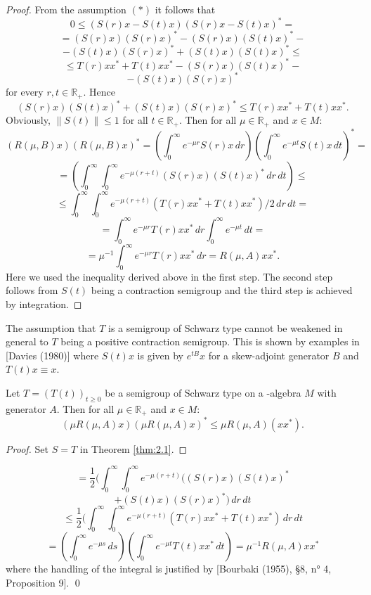 \begin{proof}
From the assumption $ (*) $ it follows that
\[
0 \leq (S(r)x - S(t)x)(S(r)x - S(t)x)^* =
\]
\[
= (S(r)x)(S(r)x)^* - (S(r)x)(S(t)x)^* -
\]
\[
- (S(t)x)(S(r)x)^* + (S(t)x)(S(t)x)^* \leq
\]
\[
\leq T(r)xx^* + T(t)xx^* - (S(r)x)(S(t)x)^* -
\]
\[
- (S(t)x)(S(r)x)^*
\]
for every $ r,t \in \mathbb{R}_+ $.
Hence
\[
(S(r)x)(S(t)x)^* + (S(t)x)(S(r)x)^* \leq T(r)xx^* + T(t)xx^*.
\]
Obviously, $ \|S(t)\| \leq 1 $ for all $ t \in \mathbb{R}_+ $.
Then for all $ \mu \in \mathbb{R}_+ $ and $ x \in M $:
\[
(R(\mu,B)x)(R(\mu,B)x)^* = (\int_0^\infty e^{-\mu r}S(r)x \, dr)(\int_0^\infty e^{-\mu t}S(t)x \, dt)^* =
\]
\[
= (\int_0^\infty \int_0^\infty e^{-\mu(r+t)} (S(r)x)(S(t)x)^* \, dr \, dt) \leq
\]
\[
\leq \int_0^\infty \int_0^\infty e^{-\mu(r+t)} (T(r)xx^* + T(t)xx^*)/2 \, dr \, dt =
\]
\[
= \int_0^\infty e^{-\mu r} T(r)xx^* \, dr \int_0^\infty e^{-\mu t} \, dt =
\]
\[
= \mu^{-1} \int_0^\infty e^{-\mu r} T(r)xx^* \, dr = R(\mu,A)xx^*.
\]
Here we used the inequality derived above in the first step.
The second step follows from $ S(t)$ being a contraction semigroup and the third step is achieved by integration.
\end{proof}

\begin{remark}
The assumption that $ T $ is a semigroup of Schwarz type cannot be weakened in general to $ T $ being a positive contraction semigroup.
This is shown by examples in [Davies (1980)] where $ S(t)x $ is given by $ e^{tB}x $ for a skew-adjoint generator $ B $ and $ T(t)x \equiv x $.
\end{remark}

\begin{corollary}\label{cor:2.2}
Let $ T = (T(t))_{t\geq0} $ be a semigroup of Schwarz type on a \CA-algebra $ M $ with generator $ A $.
Then for all $ \mu \in \mathbb{R}_+ $ and $ x \in M $:
\[
(\mu R(\mu,A)x)(\mu R(\mu,A)x)^* \leq \mu R(\mu,A)(xx^*).
\]
\end{corollary}

\begin{proof}
Set $ S = T $ in Theorem \ref{thm:2.1}.
\end{proof}
%

\[
= \frac{1}{2}(\int_0^\infty \int_0^\infty e^{-\mu(r+t)} ((S(r)x)(S(t)x)^*
\]
\[
+ (S(t)x)(S(r)x)^*) \, dr \, dt
\]
\[
\leq \frac{1}{2}(\int_0^\infty \int_0^\infty e^{-\mu(r+t)} (T(r)xx^* + T(t)xx^*) \, dr \, dt
\]
\[
= (\int_0^\infty e^{-\mu s} \, ds)(\int_0^\infty e^{-\mu t}T(t)xx^* \, dt) = \mu^{-1}R(\mu,A)xx^*
\]
where the handling of the integral is justified by [Bourbaki (1955), §8, n° 4, Proposition 9].
\qed

